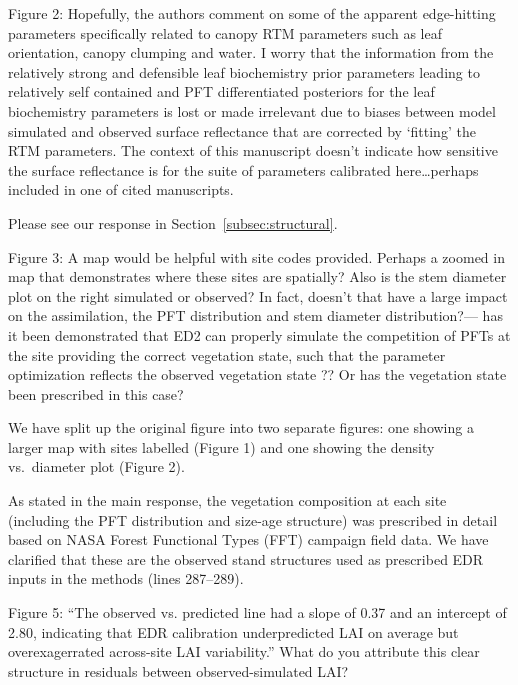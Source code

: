 \begin{reviewer}
  Figure 2: Hopefully, the authors comment on some of the apparent edge-hitting parameters specifically related to canopy RTM parameters such as leaf orientation, canopy clumping and water.
  I worry that the information from the relatively strong and defensible leaf biochemistry prior parameters leading to relatively self contained and PFT differentiated posteriors for the leaf biochemistry parameters is lost or made irrelevant due to biases between model simulated and observed surface reflectance that are corrected by ‘fitting’ the RTM parameters.
  The context of this manuscript doesn’t indicate how sensitive the surface reflectance is for the suite of parameters calibrated here\ldots perhaps included in one of cited manuscripts.
\end{reviewer}

Please see our response in Section~\ref{subsec:structural}.

\begin{reviewer}
  Figure 3: A map would be helpful with site codes provided. Perhaps a zoomed in map that demonstrates where these sites are spatially? Also is the stem diameter plot on the right simulated or observed? In fact, doesn’t that have a large impact on the assimilation, the PFT distribution and stem diameter distribution?— has it been demonstrated that ED2 can properly simulate the competition of PFTs at the site providing the correct vegetation state, such that the parameter optimization reflects the observed vegetation state ?? Or has the vegetation state been prescribed in this case?
\end{reviewer}

We have split up the original figure into two separate figures:
one showing a larger map with sites labelled (Figure 1) and one showing the density vs.\ diameter plot (Figure 2).

As stated in the main response, the vegetation composition at each site (including the PFT distribution and size-age structure) was prescribed in detail based on NASA Forest Functional Types (FFT) campaign field data.
We have clarified that these are the observed stand structures used as prescribed EDR inputs in the methods (lines 287--289).

\begin{reviewer}
  Figure 5: “The observed vs. predicted line had a slope of 0.37 and an intercept of 2.80, indicating that EDR calibration underpredicted LAI on average but overexagerrated across-site LAI variability.” What do you attribute this clear structure in residuals between observed-simulated LAI?
\end{reviewer}

